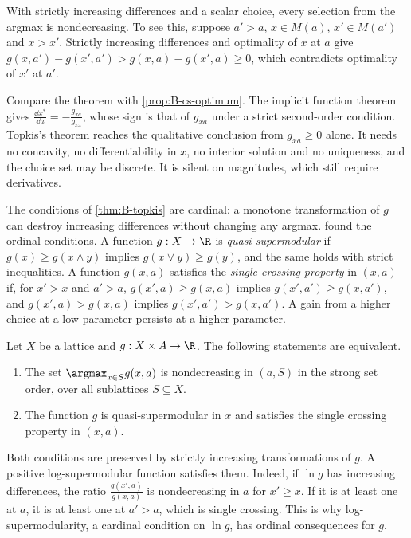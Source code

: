 With strictly increasing differences and a scalar choice, every selection from the argmax is nondecreasing. To
see this, suppose $a' > a$, $x \in M(a)$, $x' \in M(a')$ and $x > x'$. Strictly increasing differences and optimality of $x$
at $a$ give $g(x, a') - g(x', a') > g(x, a) - g(x', a) \geq 0$, which contradicts optimality of $x'$ at $a'$.

Compare the theorem with \cref{prop:B-cs-optimum}. The implicit function theorem gives
$\frac{\dd x^*}{\dd a} = -\frac{g_{xa}}{g_{xx}}$, whose sign is that of $g_{xa}$ under a strict second-order condition.
Topkis's theorem reaches the qualitative conclusion from $g_{xa} \geq 0$ alone. It needs no concavity, no
differentiability in $x$, no interior solution and no uniqueness, and the choice set may be discrete. It is silent
on magnitudes, which still require derivatives.

The conditions of \cref{thm:B-topkis} are cardinal: a monotone transformation of $g$ can destroy increasing
differences without changing any argmax. \citet{MilgromShannon1994} found the ordinal conditions. A function
$g : X \to \R$ is \emph{quasi-supermodular} if $g(x) \geq g(x \wedge y)$ implies $g(x \vee y) \geq g(y)$, and the same holds
with strict inequalities. A function $g(x, a)$ satisfies the \emph{single crossing property} in $(x, a)$ if, for
$x' > x$ and $a' > a$, $g(x', a) \geq g(x, a)$ implies $g(x', a') \geq g(x, a')$, and $g(x', a) > g(x, a)$ implies
$g(x', a') > g(x, a')$. A gain from a higher choice at a low parameter persists at a higher parameter.

\begin{theorem}\label{thm:B-milgrom-shannon}
Let $X$ be a lattice and $g : X \times A \to \R$. The following statements are equivalent.
\begin{enumerate}[label=(\alph*)]
  \item The set $\argmax_{x \in S}g(x, a)$ is nondecreasing in $(a, S)$ in the strong set order, over all sublattices
  $S \subseteq X$.
  \item The function $g$ is quasi-supermodular in $x$ and satisfies the single crossing property in $(x, a)$.
\end{enumerate}
\end{theorem}

Both conditions are preserved by strictly increasing transformations of $g$. A positive log-supermodular
function satisfies them. Indeed, if $\ln g$ has increasing differences, the ratio $\frac{g(x', a)}{g(x, a)}$ is
nondecreasing in $a$ for $x' \geq x$. If it is at least one at $a$, it is at least one at $a' > a$, which is single
crossing. This is why log-supermodularity, a cardinal condition on $\ln g$, has ordinal consequences for $g$.

